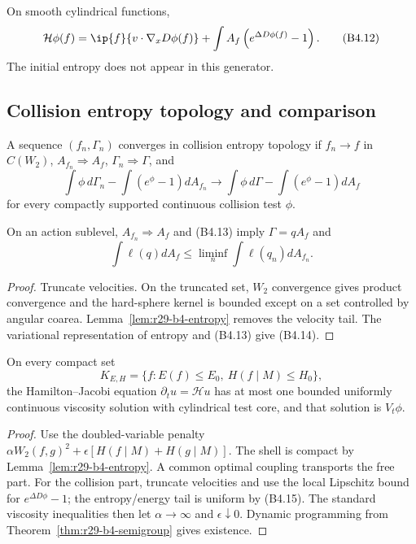 On smooth cylindrical functions,
\[
 \mathcal H\phi(f)=
 \ip{f}{v\cdot\nabla_xD\phi(f)}+
 \int A_f\left(e^{\Delta D\phi(f)}-1\right).              \tag{B4.12}
\]
The initial entropy does not appear in this generator.

\subsection{Collision entropy topology and comparison}

A sequence $(f_n,\Gamma_n)$ converges in collision entropy topology if
$f_n\to f$ in $C(W_2)$, $A_{f_n}\Rightarrow A_f$,
$\Gamma_n\Rightarrow\Gamma$, and
\[
 \int\phi\,d\Gamma_n-
 \int(e^\phi-1)dA_{f_n}\to
 \int\phi\,d\Gamma-
 \int(e^\phi-1)dA_f                                     \tag{B4.13}
\]
for every compactly supported continuous collision test $\phi$.

\begin{proposition}
\label{prop:r29-b4-closure}
On an action sublevel, $A_{f_n}\Rightarrow A_f$ and (B4.13) imply
$\Gamma=qA_f$ and
\[
 \int\ell(q)dA_f\le\liminf_n\int\ell(q_n)dA_{f_n}.        \tag{B4.14}
\]
\end{proposition}

\begin{proof}
Truncate velocities.  On the truncated set, $W_2$ convergence gives product
convergence and the hard-sphere kernel is bounded except on a set controlled
by angular coarea.  Lemma~\ref{lem:r29-b4-entropy} removes the velocity tail.
The variational representation of entropy and (B4.13) give (B4.14).
\end{proof}

\begin{theorem}
\label{thm:r29-b4-comparison}
On every compact set
\[
 K_{E,H}=\{f:E(f)\le E_0,\ H(f\mid M)\le H_0\},            \tag{B4.15}
\]
the Hamilton--Jacobi equation $\partial_tu=\mathcal Hu$ has at most one
bounded uniformly continuous viscosity solution with cylindrical test core,
and that solution is $V_t\phi$.
\end{theorem}

\begin{proof}
Use the doubled-variable penalty
$\alpha W_2(f,g)^2+\epsilon[H(f\mid M)+H(g\mid M)]$.
The shell is compact by Lemma~\ref{lem:r29-b4-entropy}.  A common optimal
coupling transports the free part.  For the collision part, truncate
velocities and use the local Lipschitz bound for
$e^{\Delta D\phi}-1$; the entropy/energy tail is uniform by (B4.15).
The standard viscosity inequalities then let
$\alpha\to\infty$ and $\epsilon\downarrow0$.  Dynamic programming from
Theorem~\ref{thm:r29-b4-semigroup} gives existence.
\end{proof}

